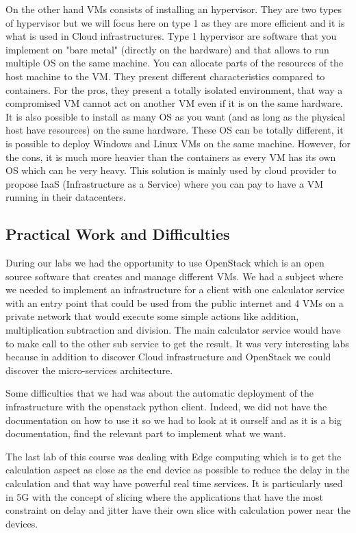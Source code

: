 On the other hand VMs consists of installing an hypervisor. They are two types of hypervisor but we will focus here on type 1 as they are more efficient and it is what is used in Cloud infrastructures. Type 1 hypervisor are software that you implement on "bare metal" (directly on the hardware) and that allows to run multiple OS on the same machine. You can allocate parts of the resources of the host machine to the VM. They present different characteristics compared to containers. For the pros, they present a totally isolated environment, that way a compromised VM cannot act on another VM even if it is on the same hardware. It is also possible to install as many OS as you want (and as long as the physical host have resources) on the same hardware. These OS can be totally different, it is possible to deploy Windows and Linux VMs on the same machine. However, for the cons, it is much more heavier than the containers as every VM has its own OS which can be very heavy. This solution is mainly used by cloud provider to propose IaaS (Infrastructure as a Service) where you can pay to have a VM running in their datacenters.

\subsection{Practical Work and Difficulties}

During our labs we had the opportunity to use OpenStack which is an open source software that creates and manage different VMs. We had a subject where we needed to implement an infrastructure for a client with one calculator service with an entry point that could be used from the public internet and 4 VMs on a private network that would execute some simple actions like addition, multiplication subtraction  and division. The main calculator service would have to make call to the other sub service to get the result. It was very interesting labs because in addition to discover Cloud infrastructure and OpenStack we could discover the micro-services architecture.
\smallskip

Some difficulties that we had was about the automatic deployment of the infrastructure with the openstack python client. Indeed, we did not have the documentation on how to use it so we had to look at it ourself and as it is a big documentation, find the relevant part to implement what we want. 
\smallskip

The last lab of this course was dealing with Edge computing which is to get the calculation aspect as close as the end device as possible to reduce the delay in the calculation and that way have powerful real time services. It is particularly used in 5G with the concept of slicing where the applications that have the most constraint on delay and jitter have their own slice with calculation power near the devices.

